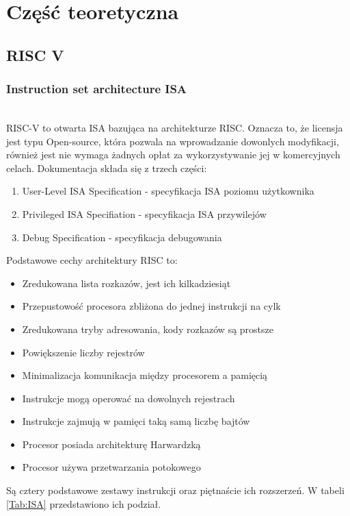 \documentclass[11pt,a4paper]{article}
\begin{document}
\section{Część teoretyczna}

	\subsection{RISC V}

		\subsubsection{Instruction set architecture ISA}
		\hspace{5mm}
		\\
		RISC-V to otwarta ISA bazująca na architekturze RISC. Oznacza to, że licensja jest typu Open-source, która pozwala na wprowadzanie dowonlych modyfikacji\cite{open_source}, również jest nie wymaga żadnych opłat za wykorzystywanie jej w komercyjnych celach. Dokumentacja składa się z trzech części\cite{isa_site}:
		\begin{enumerate}
			\item User-Level ISA Specification - specyfikacja ISA poziomu użytkownika
			\item Privileged ISA Specifiation - specyfikacja ISA przywilejów
			\item Debug Specification - specyfikacja debugowania 
		\end{enumerate}
		Podstawowe cechy architektury RISC to:
		\begin{itemize}
		\item Zredukowana lista rozkazów, jest ich kilkadziesiąt
		\item Przepustowość procesora zbliżona do jednej instrukcji na cylk
		\item Zredukowana tryby adresowania, kody rozkazów są prostsze
		\item Powiększenie liczby rejestrów
		\item Minimalizacja komunikacja między procesorem a pamięcią
		\item Instrukcje mogą operować na dowolnych rejestrach
		\item Instrukcje zajmują w pamięci taką samą liczbę bajtów
		\item Procesor posiada architekturę Harwardzką
		\item Procesor używa przetwarzania potokowego
		\end{itemize}
		Są cztery podstawowe zestawy instrukcji oraz piętnaście ich rozszerzeń. W tabeli \ref{Tab:ISA} przedstawiono ich podział.
\end{document}
